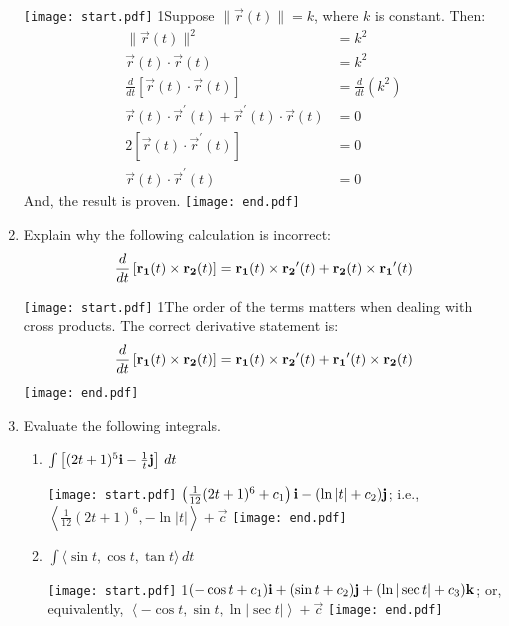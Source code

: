 \documentclass[12pt]{article}
\begin{document}
\begin{enumerate}
\texttt{[image: start.pdf]}
{{{1\linewidth}{Suppose $\|\overrightarrow{r}(t)\|=k$, where $k$ is constant.  Then:
\begin{align*}
\|\overrightarrow{r}(t)\|^2&=k^2\\
\overrightarrow{r}(t)\cdot\overrightarrow{r}(t)&=k^2\\
\frac{d}{dt}\left[\overrightarrow{r}(t)\cdot\overrightarrow{r}(t)\right]&=\frac{d}{dt}\left(k^2\right)\\
\overrightarrow{r}(t)\cdot \overrightarrow{r}^{\prime}(t)+\overrightarrow{r}^{\prime}(t)\cdot \overrightarrow{r}(t)&=0\\
2\left[\overrightarrow{r}(t)\cdot \overrightarrow{r}^{\prime}(t)\right]&=0\\
\overrightarrow{r}(t)\cdot \overrightarrow{r}^{\prime}(t)&=0
\end{align*}
And, the result is proven.
}}}
\texttt{[image: end.pdf]}


\item Explain why the following calculation is incorrect:
$$\frac{d}{dt}\left[{\bf r_1}(t)\times{\bf r_2}(t)\right]={\bf r_1}(t)\times {\bf r_2}^{\prime}(t)+{\bf r_2}(t)\times{\bf r_1}^{\prime}(t)$$

\texttt{[image: start.pdf]}
{{{1\linewidth}{The order of the terms matters when dealing with cross products.  The correct derivative statement is:
$$\frac{d}{dt}\left[{\bf r_1}(t)\times{\bf r_2}(t)\right]={\bf r_1}(t)\times {\bf r_2}^{\prime}(t)+{\bf r_1}^{\prime}(t)\times{\bf r_2}(t)$$}}}
\texttt{[image: end.pdf]}


\item Evaluate the following integrals.

\begin{enumerate}

\item $\int \left[(2t+1)^5{\bf i}-\frac{1}{t}{\bf j}\right]\,dt$

\texttt{[image: start.pdf]}
{{$\left(\frac{1}{12}(2t+1)^6+c_1\right){\bf i}-(\ln{|t|}+c_2){\bf j}$; i.e., $\left\langle\frac{1}{12}(2t+1)^6,-\ln{|t|}\right\rangle+\overrightarrow{c}$}}
\texttt{[image: end.pdf]}


\item $\int \langle \sin{t},\cos{t},\tan{t} \rangle \,dt$

\texttt{[image: start.pdf]}
{{{1\linewidth}{$(-\cos{t}+c_1){\bf i}+(\sin{t}+c_2){\bf j}+(\ln{|\sec{t}|}+c_3){\bf k}$; or, equivalently,
$\left\langle -\cos{t}, \sin{t}, \ln{|\sec{t}|}\right\rangle+\overrightarrow{c}$}}}
\texttt{[image: end.pdf]}



\end{enumerate}
\end{enumerate}
\end{document}
